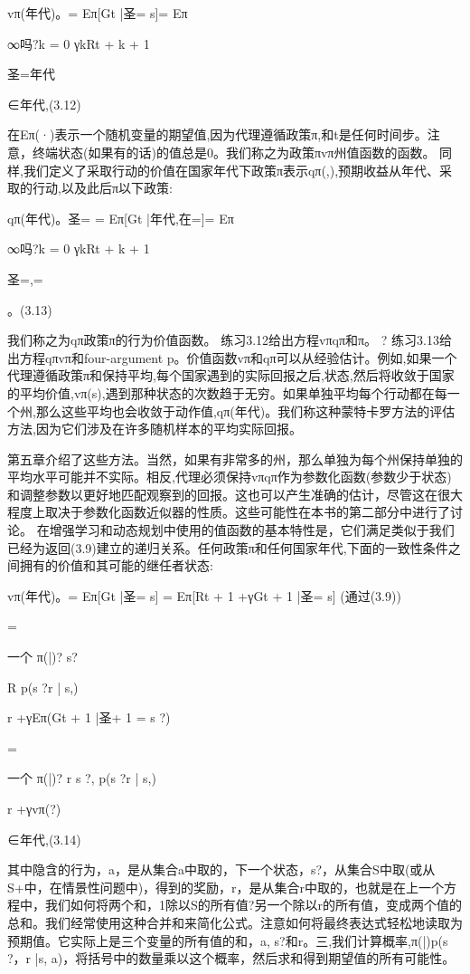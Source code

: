 vπ(年代)。= Eπ[Gt |圣= s]= Eπ

∞吗?k = 0
γkRt + k + 1

圣=年代

∈年代,(3.12)

在Eπ(·)表示一个随机变量的期望值,因为代理遵循政策π,和t是任何时间步。注意，终端状态(如果有的话)的值总是0。我们称之为政策πvπ州值函数的函数。
同样,我们定义了采取行动的价值在国家年代下政策π表示qπ(,),预期收益从年代、采取的行动,以及此后π以下政策:


qπ(年代)。圣= = Eπ[Gt |年代,在=]= Eπ

∞吗?k = 0
γkRt + k + 1

圣=,=

。(3.13)


我们称之为qπ政策π的行为价值函数。
练习3.12给出方程vπqπ和π。 					?
练习3.13给出方程qπvπ和four-argument p。价值函数vπ和qπ可以从经验估计。例如,如果一个
代理遵循政策π和保持平均,每个国家遇到的实际回报之后,状态,然后将收敛于国家的平均价值,vπ(s),遇到那种状态的次数趋于无穷。如果单独平均每个行动都在每一个州,那么这些平均也会收敛于动作值,qπ(年代)。我们称这种蒙特卡罗方法的评估方法,因为它们涉及在许多随机样本的平均实际回报。


第五章介绍了这些方法。当然，如果有非常多的州，那么单独为每个州保持单独的平均水平可能并不实际。相反,代理必须保持vπqπ作为参数化函数(参数少于状态)和调整参数以更好地匹配观察到的回报。这也可以产生准确的估计，尽管这在很大程度上取决于参数化函数近似器的性质。这些可能性在本书的第二部分中进行了讨论。
在增强学习和动态规划中使用的值函数的基本特性是，它们满足类似于我们已经为返回(3.9)建立的递归关系。任何政策π和任何国家年代,下面的一致性条件之间拥有的价值和其可能的继任者状态:


vπ(年代)。= Eπ[Gt |圣= s]
= Eπ[Rt + 1 +γGt + 1 |圣= s] 					(通过(3.9))

=

一个
π(|)?
s?

R
p(s ?r | s,)

r +γEπ(Gt + 1 |圣+ 1 = s ?)


=

一个
π(|)?
r s ?,
p(s ?r | s,)

r +γvπ(?)

∈年代,(3.14)


其中隐含的行为，a，是从集合a中取的，下一个状态，s?，从集合S中取(或从S+中，在情景性问题中)，得到的奖励，r，是从集合r中取的，也就是在上一个方程中，我们如何将两个和，1除以S的所有值?另一个除以r的所有值，变成两个值的总和。我们经常使用这种合并和来简化公式。注意如何将最终表达式轻松地读取为预期值。它实际上是三个变量的所有值的和，a, s?和r。三,我们计算概率,π(|)p(s ?，r |s, a)，将括号中的数量乘以这个概率，然后求和得到期望值的所有可能性。




